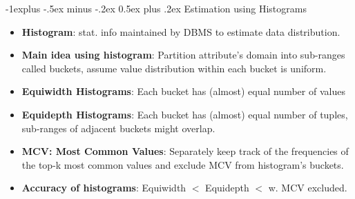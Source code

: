 \documentclass[10pt, landscape]{article}
\makeatletter
\renewcommand{\subsection}{\@startsection{subsection}{2}{0mm}%
                                {-1explus -.5ex minus -.2ex}%
                                {0.5ex plus .2ex}%
                                {\normalfont\normalsize\bfseries}}
\makeatother
\begin{document}
\begin{multicols*}{3}
\subsection{Estimation using Histograms}
\begin{itemize}
\item \textbf{Histogram}: stat. info maintained by DBMS to estimate data distribution.
\item \textbf{Main idea using histogram}: Partition attribute’s domain into sub-ranges called buckets, assume value distribution within each bucket is uniform.
\item \textbf{Equiwidth Histograms}: Each bucket has (almost) equal number of values
\item \textbf{Equidepth Histograms}: Each bucket has (almost) equal number of tuples, sub-ranges of adjacent buckets might overlap.
\item \textbf{MCV: Most Common Values}: Separately keep track of the frequencies of the top-k most common
values and exclude MCV from histogram’s buckets.
\item \textbf{Accuracy of histograms}: Equiwidth $<$ Equidepth $<$ w. MCV excluded.
\end{itemize}


\end{multicols*}
\end{document}
